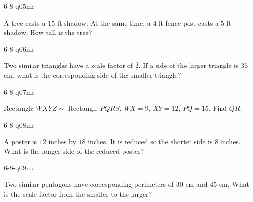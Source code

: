 \begin{practiceQuestion}{6-8-q05}{mc}
\begin{questionText}
A tree casts a $15$-ft shadow. At the same time, a $4$-ft fence post casts a $5$-ft shadow. How tall is the tree?
\end{questionText}
\end{practiceQuestion}

\begin{practiceQuestion}{6-8-q06}{mc}
\begin{questionText}
Two similar triangles have a scale factor of $\frac{3}{7}$. If a side of the larger triangle is $35$ cm, what is the corresponding side of the smaller triangle?
\end{questionText}
\end{practiceQuestion}

\begin{practiceQuestion}{6-8-q07}{mc}
\begin{questionText}
Rectangle $WXYZ \sim$ Rectangle $PQRS$. $WX = 9$, $XY = 12$, $PQ = 15$. Find $QR$.
\end{questionText}
\end{practiceQuestion}

\begin{practiceQuestion}{6-8-q08}{mc}
\begin{questionText}
A poster is $12$ inches by $18$ inches. It is reduced so the shorter side is $8$ inches. What is the longer side of the reduced poster?
\end{questionText}
\end{practiceQuestion}

\begin{practiceQuestion}{6-8-q09}{mc}
\begin{questionText}
Two similar pentagons have corresponding perimeters of $30$ cm and $45$ cm. What is the scale factor from the smaller to the larger?
\end{questionText}
\end{practiceQuestion}

